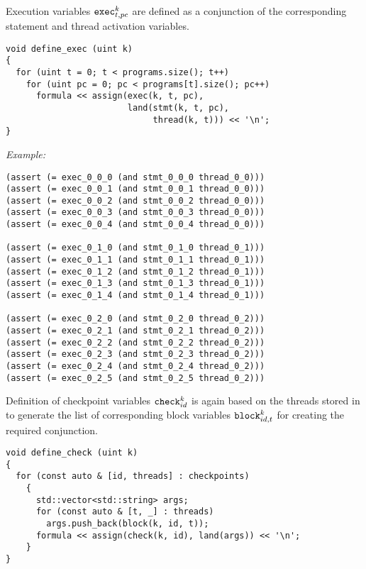 \noindent
Execution variables $\texttt{exec}^k_{t, pc}$ are defined as a conjunction of the corresponding statement and thread activation variables.

\begin{lstlisting}[style=c++]
void define_exec (uint k)
{
  for (uint t = 0; t < programs.size(); t++)
    for (uint pc = 0; pc < programs[t].size(); pc++)
      formula << assign(exec(k, t, pc),
                        land(stmt(k, t, pc),
                             thread(k, t))) << '\n';
}
\end{lstlisting}

\noindent
\emph{Example:} 

\begin{lstlisting}[style=smtlib]
(assert (= exec_0_0_0 (and stmt_0_0_0 thread_0_0)))
(assert (= exec_0_0_1 (and stmt_0_0_1 thread_0_0)))
(assert (= exec_0_0_2 (and stmt_0_0_2 thread_0_0)))
(assert (= exec_0_0_3 (and stmt_0_0_3 thread_0_0)))
(assert (= exec_0_0_4 (and stmt_0_0_4 thread_0_0)))

(assert (= exec_0_1_0 (and stmt_0_1_0 thread_0_1)))
(assert (= exec_0_1_1 (and stmt_0_1_1 thread_0_1)))
(assert (= exec_0_1_2 (and stmt_0_1_2 thread_0_1)))
(assert (= exec_0_1_3 (and stmt_0_1_3 thread_0_1)))
(assert (= exec_0_1_4 (and stmt_0_1_4 thread_0_1)))

(assert (= exec_0_2_0 (and stmt_0_2_0 thread_0_2)))
(assert (= exec_0_2_1 (and stmt_0_2_1 thread_0_2)))
(assert (= exec_0_2_2 (and stmt_0_2_2 thread_0_2)))
(assert (= exec_0_2_3 (and stmt_0_2_3 thread_0_2)))
(assert (= exec_0_2_4 (and stmt_0_2_4 thread_0_2)))
(assert (= exec_0_2_5 (and stmt_0_2_5 thread_0_2)))
\end{lstlisting}


\noindent
Definition of checkpoint variables $\texttt{check}^k_{id}$ is again based on the threads stored in  to generate the list of corresponding block variables $\texttt{block}^k_{id, t}$ for creating the required conjunction.

\begin{lstlisting}[style=c++]
void define_check (uint k)
{
  for (const auto & [id, threads] : checkpoints)
    {
      std::vector<std::string> args;
      for (const auto & [t, _] : threads)
        args.push_back(block(k, id, t));
      formula << assign(check(k, id), land(args)) << '\n';
    }
}
\end{lstlisting}

